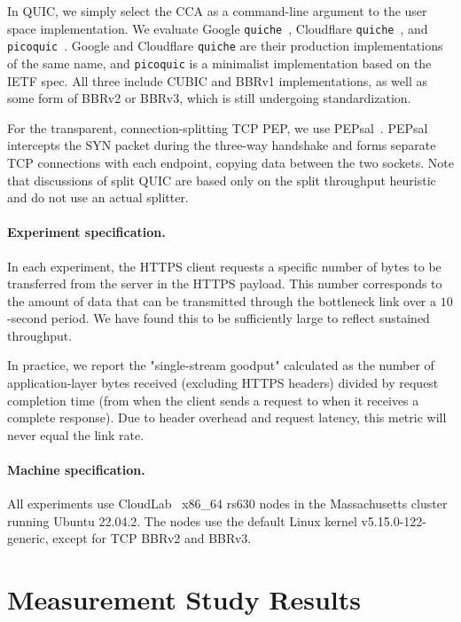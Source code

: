 In QUIC, we simply select the CCA as a command-line
argument to the user space implementation. We evaluate Google \texttt
{quiche}~\cite{google-quiche}, Cloudflare \texttt{quiche}~\cite
{quiche}, and \texttt{picoquic}~\cite{picoquic}. Google and Cloudflare \texttt
{quiche} are their production implementations of the same name,
and \texttt{picoquic} is a minimalist implementation based on the IETF spec.
All three include CUBIC and BBRv1 implementations, as well as some form of
BBRv2 or BBRv3, which is still undergoing standardization.

For the transparent, connection-splitting TCP PEP, we use PEPsal~\cite
{caini2006pepsal}. PEPsal intercepts the SYN packet during the three-way
handshake and forms separate TCP connections with each endpoint,
copying data between the two sockets. Note that
discussions of split QUIC are based only on the split throughput heuristic
and do not use an actual splitter.

\paragraph{Experiment specification.}
In each experiment, the HTTPS client requests a specific number of bytes to be
transferred from the server in the HTTPS payload. This number corresponds to the
amount of data that can be transmitted through the bottleneck link over a
$10$-second period. We have found this to be sufficiently large to reflect
sustained throughput.

In practice, we report the "single-stream goodput" calculated as the number of
application-layer bytes received (excluding HTTPS headers) divided by request
completion time (from when the client sends a request to when it receives a
complete response). Due to header overhead and request latency, this metric
will never equal the link rate.

\paragraph{Machine specification.} All experiments use CloudLab~\cite
 {duplyakin2019design} x86\_64 rs630 nodes in the Massachusetts cluster running
 Ubuntu 22.04.2. The nodes use the default Linux kernel v5.15.0-122-generic,
 except for TCP BBRv2 and BBRv3.%

\section{Measurement Study Results}
\label{sec:splitting:results}

